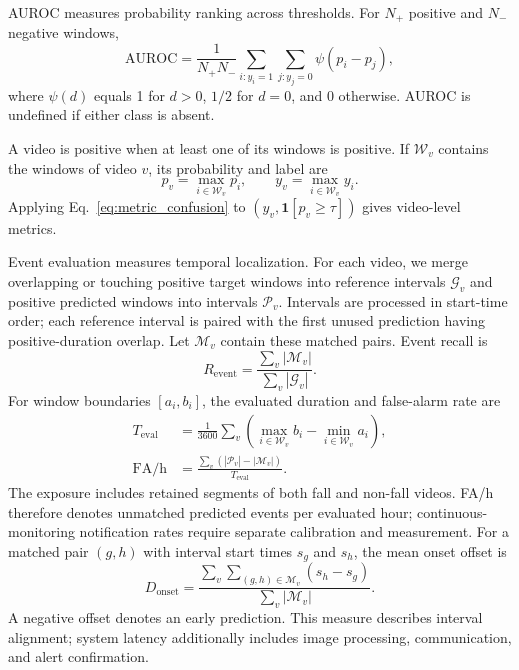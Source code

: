 AUROC measures probability ranking across thresholds. For $N_+$ positive and $N_-$ negative windows,
\begin{equation}
\mathrm{AUROC}=\frac{1}{N_+N_-}
\sum_{i:y_i=1}\sum_{j:y_j=0}\psi(p_i-p_j),
\label{eq:metric_auc}
\end{equation}
where $\psi(d)$ equals 1 for $d>0$, $1/2$ for $d=0$, and 0 otherwise. AUROC is undefined if either class is absent.

A video is positive when at least one of its windows is positive. If $\mathcal W_v$ contains the windows of video $v$, its probability and label are
\begin{equation}
 p_v=\max_{i\in\mathcal W_v}p_i,\qquad
 y_v=\max_{i\in\mathcal W_v}y_i.
\label{eq:metric_video}
\end{equation}
Applying Eq.~\eqref{eq:metric_confusion} to $(y_v,\mathbf{1}[p_v\geq\tau])$ gives video-level metrics.

Event evaluation measures temporal localization. For each video, we merge overlapping or touching positive target windows into reference intervals $\mathcal G_v$ and positive predicted windows into intervals $\mathcal P_v$. Intervals are processed in start-time order; each reference interval is paired with the first unused prediction having positive-duration overlap. Let $\mathcal M_v$ contain these matched pairs. Event recall is
\begin{equation}
 R_{\mathrm{event}}=\frac{\sum_v|\mathcal M_v|}{\sum_v|\mathcal G_v|}.
\label{eq:metric_event}
\end{equation}
For window boundaries $[a_i,b_i]$, the evaluated duration and false-alarm rate are
\begin{equation}
\begin{aligned}
 T_{\mathrm{eval}}&=\frac{1}{3600}\sum_v
 \left(\max_{i\in\mathcal W_v}b_i-\min_{i\in\mathcal W_v}a_i\right),\\
 \mathrm{FA/h}&=\frac{\sum_v\left(|\mathcal P_v|-|\mathcal M_v|\right)}{T_{\mathrm{eval}}}.
\end{aligned}
\label{eq:metric_far}
\end{equation}
The exposure includes retained segments of both fall and non-fall videos. FA/h therefore denotes unmatched predicted events per evaluated hour; continuous-monitoring notification rates require separate calibration and measurement. For a matched pair $(g,h)$ with interval start times $s_g$ and $s_h$, the mean onset offset is
\begin{equation}
 D_{\mathrm{onset}}=\frac{\sum_v\sum_{(g,h)\in\mathcal M_v}(s_h-s_g)}{\sum_v|\mathcal M_v|}.
\label{eq:metric_onset}
\end{equation}
A negative offset denotes an early prediction. This measure describes interval alignment; system latency additionally includes image processing, communication, and alert confirmation.

